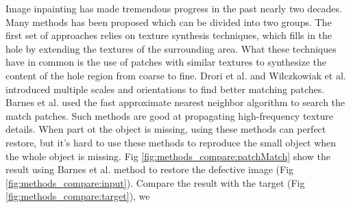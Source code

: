 \documentclass{IEEE_lsens}
\begin{document}
Image inpainting has made tremendous progress in the past nearly two decades. Many methods has been proposed which can be divided into two groups. The first set of approaches relies on texture synthesis techniques, which fills in the hole by extending the textures of the surrounding area\cite{Efros1999::Texture,Drori2003::Fragment,Wilczkowiak2005::Hole,Barnes2009:AToG:PatchMatch:}. What these techniques have in common is the use of patches with similar textures to synthesize the content of the hole region from coarse to fine. Drori et al.\cite{Drori2003::Fragment} and Wilczkowiak et al.\cite{Wilczkowiak2005::Hole} introduced multiple scales and orientations to find better matching patches. Barnes et al.\cite{Barnes2009:AToG:PatchMatch:} used the fast approximate nearest neighbor algorithm to search the match patches. Such methods are good at propagating high-frequency texture details. When part ot the object is missing, using these methods can perfect restore, but it's hard to use these methods to reproduce the small object when the whole object is missing. Fig \ref{fig:methods_compare:patchMatch} show the result using Barnes et al.\cite{Barnes2009:AToG:PatchMatch:} method to restore the defective image (Fig \ref{fig:methods_compare:input}). Compare the result with the target (Fig \ref{fig:methods_compare:target}), we 
\end{document}
